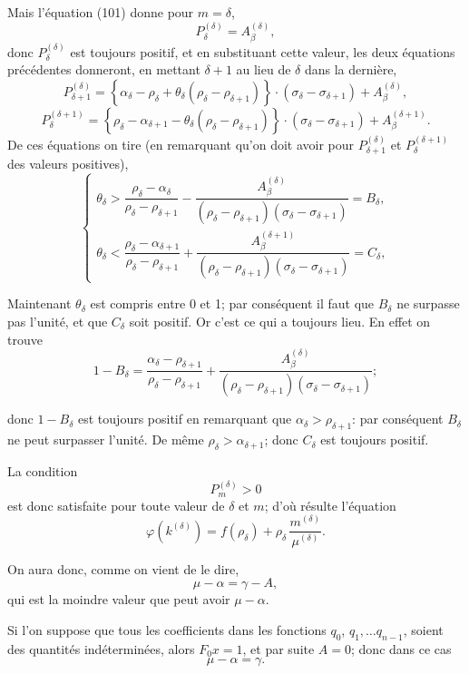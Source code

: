 \documentclass{article}
\begin{document}
Mais l'équation (101) donne pour $m = \delta$,
\[ P_\delta^{(\delta)} = A_\beta^{(\delta)}, \]
donc $P_\delta^{(\delta)}$ est toujours positif, et en substituant cette valeur, les deux équations précédentes donneront, en mettant $\delta+1$ au lieu de $\delta$ dans la dernière,
\[ P_{\delta+1}^{(\delta)} = \left\{\alpha_\delta - \rho_\delta + \theta_\delta(\rho_\delta-\rho_{\delta+1})\right\} \cdot (\sigma_\delta-\sigma_{\delta+1}) + A_\beta^{(\delta)}, \]
\[ P_\delta^{(\delta+1)} = \left\{\rho_\delta - \alpha_{\delta+1} - \theta_\delta(\rho_\delta-\rho_{\delta+1})\right\} \cdot (\sigma_\delta-\sigma_{\delta+1}) + A_\beta^{(\delta+1)}. \]
De ces équations on tire (en remarquant qu'on doit avoir pour $P_{\delta+1}^{(\delta)}$ et $P_\delta^{(\delta+1)}$ des valeurs positives),
\[ \begin{cases}
\theta_\delta > \dfrac{\rho_\delta-\alpha_\delta}{\rho_\delta-\rho_{\delta+1}} - \dfrac{A_\beta^{(\delta)}}{(\rho_\delta-\rho_{\delta+1})(\sigma_\delta-\sigma_{\delta+1})} = B_\delta, \\
\theta_\delta < \dfrac{\rho_\delta-\alpha_{\delta+1}}{\rho_\delta-\rho_{\delta+1}} + \dfrac{A_\beta^{(\delta+1)}}{(\rho_\delta-\rho_{\delta+1})(\sigma_\delta-\sigma_{\delta+1})} = C_\delta,
\end{cases} \tag{103} \]

Maintenant $\theta_\delta$ est compris entre 0 et 1; par conséquent il faut que $B_\delta$ ne surpasse pas l'unité, et que $C_\delta$ soit positif. Or c'est ce qui a toujours lieu. En effet on trouve
\[ 1 - B_\delta = \frac{\alpha_\delta - \rho_{\delta+1}}{\rho_\delta-\rho_{\delta+1}} + \frac{A_\beta^{(\delta)}}{(\rho_\delta-\rho_{\delta+1})(\sigma_\delta-\sigma_{\delta+1})}; \]

donc $1-B_\delta$ est toujours positif en remarquant que $\alpha_\delta > \rho_{\delta+1}$: par conséquent $B_\delta$ ne peut surpasser l'unité. De même $\rho_\delta > \alpha_{\delta+1}$; donc $C_\delta$ est toujours positif.

La condition
\[ P_m^{(\delta)} > 0 \]
est donc satisfaite pour toute valeur de $\delta$ et $m$; d'où résulte l'équation
\[ \varphi(k^{(\delta)}) = f(\rho_\delta) + \rho_\delta\,\frac{m^{(\delta)}}{\mu^{(\delta)}}. \]

On aura donc, comme on vient de le dire,
\[ \mu - \alpha = \gamma - A, \tag{104} \]
qui est la moindre valeur que peut avoir $\mu-\alpha$.

Si l'on suppose que tous les coefficients dans les fonctions $q_0$,
$q_1, \ldots q_{n-1}$, soient des quantités indéterminées, alors $F_0 x = 1$, et par suite $A = 0$; donc dans ce cas
\[ \mu - \alpha = \gamma. \tag{105} \]
\end{document}
